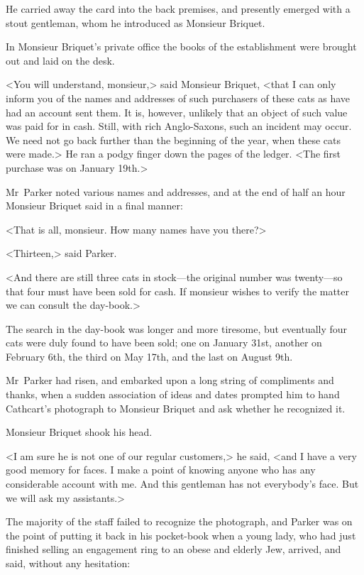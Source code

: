 He carried away the card into the back premises, and presently emerged with a stout gentleman, whom he introduced as Monsieur Briquet.

In Monsieur Briquet's private office the books of the establishment were brought out and laid on the desk.

<You will understand, monsieur,> said Monsieur Briquet, <that I can only inform you of the names and addresses of such purchasers of these cats as have had an account sent them. It is, however, unlikely that an object of such value was paid for in cash. Still, with rich Anglo-Saxons, such an incident may occur. We need not go back further than the beginning of the year, when these cats were made.> He ran a podgy finger down the pages of the ledger. <The first purchase was on January 19th.>

Mr~Parker noted various names and addresses, and at the end of half an hour Monsieur Briquet said in a final manner:

<That is all, monsieur. How many names have you there?>

<Thirteen,> said Parker.

<And there are still three cats in stock—the original number was twenty—so that four must have been sold for cash. If monsieur wishes to verify the matter we can consult the day-book.>

The search in the day-book was longer and more tiresome, but eventually four cats were duly found to have been sold; one on January 31st, another on February 6th, the third on May 17th, and the last on August 9th.

Mr~Parker had risen, and embarked upon a long string of compliments and thanks, when a sudden association of ideas and dates prompted him to hand Cathcart's photograph to Monsieur Briquet and ask whether he recognized it.

Monsieur Briquet shook his head.

<I am sure he is not one of our regular customers,> he said, <and I have a very good memory for faces. I make a point of knowing anyone who has any considerable account with me. And this gentleman has not everybody's face. But we will ask my assistants.>

The majority of the staff failed to recognize the photograph, and Parker was on the point of putting it back in his pocket-book when a young lady, who had just finished selling an engagement ring to an obese and elderly Jew, arrived, and said, without any hesitation:

